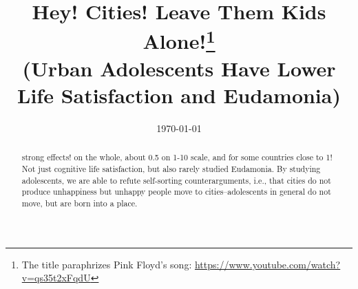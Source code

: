 \documentclass[10pt, letterpaper]{article}
\date{{}\today \hspace{.2in}\xxivtime}
\title{  %
  Hey! Cities! Leave Them Kids Alone!\footnote{The title paraphrizes Pink
    Floyd's song: \url{https://www.youtube.com/watch?v=qs35t2xFqdU}} \\
  \Large{(Urban Adolescents Have Lower Life Satisfaction and Eudamonia)} %
}
\author{
}
\begin{document}


\maketitle
\vspace{-.4in}
\begin{center}

\end{center}


\begin{abstract}
\noindent strong effects! on the whole, about 0.5 on 1-10 scale, and for some
countries close to 1! Not just cognitive life satisfaction, but also rarely
studied Eudamonia. By studying adolescents, we are able to refute self-sorting
counterarguments, i.e., that cities do not produce unhappiness but unhappy
people move to cities--adolescents in general do not move, but are born into a
place. 
\end{abstract}
\vspace{.15in} 
\noindent{\sc %
} 
\vspace{.25in} 
\end{document}
